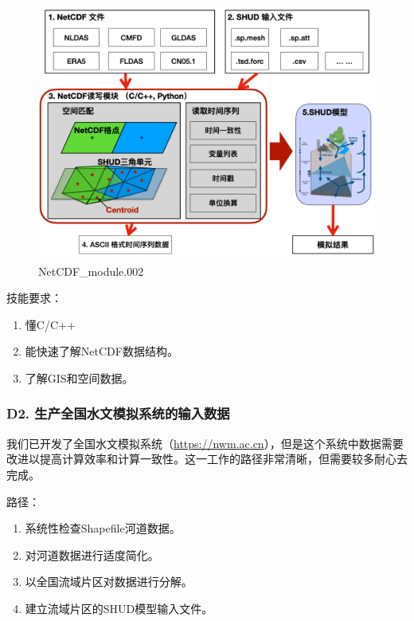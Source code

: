\documentclass[
]{book}
\providecommand{\tightlist}{%
  \setlength{\itemsep}{0pt}\setlength{\parskip}{0pt}}
\begin{document}
\begin{figure}
\centering
\includegraphics{_index.assets/NetCDF_module.002.png}
\caption{NetCDF\_module.002}
\end{figure}

技能要求：

\begin{enumerate}
\def\labelenumi{\arabic{enumi}.}
\tightlist
\item
  懂C/C++
\item
  能快速了解NetCDF数据结构。
\item
  了解GIS和空间数据。
\end{enumerate}

\hypertarget{d2.-ux751fux4ea7ux5168ux56fdux6c34ux6587ux6a21ux62dfux7cfbux7edfux7684ux8f93ux5165ux6570ux636e}{%
\subsubsection{\texorpdfstring{\textbf{D2. 生产全国水文模拟系统的输入数据}}{D2. 生产全国水文模拟系统的输入数据}}\label{d2.-ux751fux4ea7ux5168ux56fdux6c34ux6587ux6a21ux62dfux7cfbux7edfux7684ux8f93ux5165ux6570ux636e}}

我们已开发了全国水文模拟系统（\url{https://nwm.ac.cn}），但是这个系统中数据需要改进以提高计算效率和计算一致性。这一工作的路径非常清晰，但需要较多耐心去完成。

路径：

\begin{enumerate}
\def\labelenumi{\arabic{enumi}.}
\tightlist
\item
  系统性检查Shapefile河道数据。
\item
  对河道数据进行适度简化。
\item
  以全国流域片区对数据进行分解。
\item
  建立流域片区的SHUD模型输入文件。
\end{enumerate}
\end{document}

